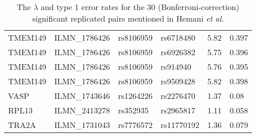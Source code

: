 \documentclass[paper=a4, fontsize=11pt]{scrartcl}         %
\numberwithin{equation}{section}                  %
\numberwithin{figure}{section}                    %
\numberwithin{table}{section}                   %
\begin{document}
\begin{table}[ht]
\begin{tabular}{llllll}
TMEM149 & ILMN\_1786426 & rs8106959 & rs6718480 & 5.82 & 0.397 \\ 
TMEM149 & ILMN\_1786426 & rs8106959 & rs6926382 & 5.75 & 0.396 \\ 
TMEM149 & ILMN\_1786426 & rs8106959 & rs914940 & 5.76 & 0.395 \\ 
TMEM149 & ILMN\_1786426 & rs8106959 & rs9509428 & 5.82 & 0.398 \\ 
VASP & ILMN\_1743646 & rs1264226 & rs2276470 & 1.37 & 0.08 \\ 
RPL13 & ILMN\_2413278 & rs352935 & rs2965817 & 1.11 & 0.058 \\ 
TRA2A & ILMN\_1731043 & rs7776572 & rs11770192 & 1.36 & 0.079 \\ 
   \hline
\end{tabular}
\caption*{The $\lambda$ and type 1 error rates for the 30 (Bonferroni-correction) significant replicated pairs mentioned in Hemani \emph{et al}.}
\end{table}


\newpage
\end{document}

